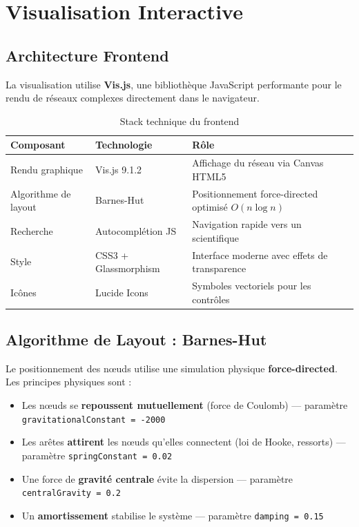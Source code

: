 \documentclass[12pt,a4paper]{report}
\begin{document}
\chapter{Visualisation Interactive}

\section{Architecture Frontend}

La visualisation utilise \textbf{Vis.js}, une bibliothèque JavaScript performante pour le rendu de réseaux complexes directement dans le navigateur.

\begin{table}[H]
\centering
\begin{tabular}{|l|l|p{6cm}|}
\hline
\rowcolor{ice500!20}
\textbf{Composant} & \textbf{Technologie} & \textbf{Rôle} \\
\hline
Rendu graphique & Vis.js 9.1.2 & Affichage du réseau via Canvas HTML5 \\
\hline
Algorithme de layout & Barnes-Hut & Positionnement force-directed optimisé $O(n \log n)$ \\
\hline
Recherche & Autocomplétion JS & Navigation rapide vers un scientifique \\
\hline
Style & CSS3 + Glassmorphism & Interface moderne avec effets de transparence \\
\hline
Icônes & Lucide Icons & Symboles vectoriels pour les contrôles \\
\hline
\end{tabular}
\caption{Stack technique du frontend}
\end{table}

\section{Algorithme de Layout : Barnes-Hut}

Le positionnement des nœuds utilise une simulation physique \textbf{force-directed}. Les principes physiques sont :

\begin{itemize}
    \item Les nœuds se \textbf{repoussent mutuellement} (force de Coulomb) — paramètre \texttt{gravitationalConstant = -2000}
    \item Les arêtes \textbf{attirent} les nœuds qu'elles connectent (loi de Hooke, ressorts) — paramètre \texttt{springConstant = 0.02}
    \item Une force de \textbf{gravité centrale} évite la dispersion — paramètre \texttt{centralGravity = 0.2}
    \item Un \textbf{amortissement} stabilise le système — paramètre \texttt{damping = 0.15}
\end{itemize}
\end{document}
